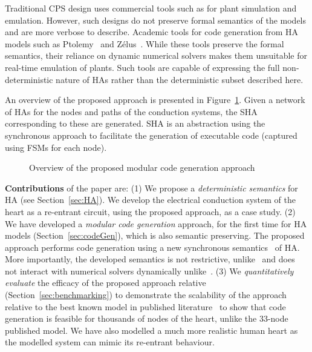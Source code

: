 {Traditional \ac{CPS} design uses commercial tools such as \simulink for plant simulation and emulation.
However, such designs do not preserve formal semantics of the models and are more verbose to describe.
Academic tools for code generation from \ac{HA} models such as Ptolemy~\cite{ptolemaeus2014system} and Z\'{e}lus~\cite{bourke13zelus}.
While these tools preserve the formal semantics, their reliance on dynamic numerical solvers makes them unsuitable for real-time emulation of plants.
Such tools are capable of expressing the full non-deterministic nature of \acp{HA} rather than the deterministic subset described here.}

   
 An overview of the proposed approach is presented
 in Figure~\ref{fig:overview}. Given a network
 of \acp{HA} for the nodes and paths of the conduction systems, the \ac{SHA} corresponding to these are generated. \ac{SHA} is an abstraction using the
synchronous approach to facilitate the generation of executable code (captured using \acp{FSM} for each node).
 
 \begin{figure}[bthp]
 	\centering
 	\scalebox{0.7}{
	 
	}
	 \caption{Overview of the proposed modular 
	 	code generation approach \label{fig:overview}}
\end{figure}
      
\textbf{Contributions} of the paper are:
(1) We propose a \emph{deterministic semantics} for \acf{HA} (see Section~\ref{sec:HA}).
We develop the electrical conduction system of the heart as a re-entrant circuit,
 using the proposed approach, as a case study.
(2) We have developed a \emph{modular code generation} approach, for the first time for \ac{HA} models (Section~\ref{sec:codeGen}), which is also semantic preserving.
The proposed approach performs code generation using a new synchronous semantics~\cite{benveniste03} of \ac{HA}. More importantly, the developed semantics is not restrictive, unlike~\cite{alur2003generating, kim2003modular} and does not interact with numerical solvers dynamically unlike~\cite{ptolemaeus2014system, bourke13zelus}.
(3) We \emph{quantitatively evaluate} the efficacy of the 
proposed approach relative \simulink (Section~\ref{sec:benchmarking}) to demonstrate the scalability of the approach relative to the 
 best known model in published literature~\cite{chen14} to show that code generation is feasible for thousands of nodes of the heart, unlike the 33-node published model. We have also modelled a much more realistic human heart as the modelled system can mimic its re-entrant behaviour.
 

